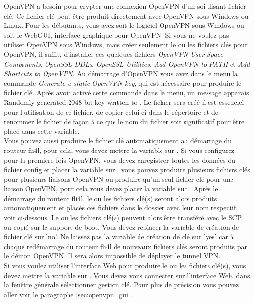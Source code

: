 \begin{description}
  OpenVPN a besoin pour crypter une connexion OpenVPN d'un soi-disant fichier clé.
  Ce fichier clé peut être produit directement avec OpenVPN sous Windows ou Linux.
  Pour les débutants, vous avez soit le logiciel OpenVPN sous Windows ou soit le
  WebGUI, interface graphique pour OpenVPN. Si vous ne voulez pas utiliser OpenVPN
  sous Windows, mais créer seulement le ou les fichiers clés pour OpenVPN, il suffit,
  d'installer ces quelques fichiers \emph{OpenVPN User-Space Components}, \emph{OpenSSL DDLs},
  \emph{OpenSSL Utilities}, \emph{Add OpenVPN to PATH} et \emph{Add Shortcuts to OpenVPN}.
  Au démarrage d'OpenVPN vous avez dans le menu la commande \emph{Generate a static OpenVPN key},
  qui est nécessaire pour produire le fichier clé. Après avoir activé cette commande
  dans le menu, un message apparais \flqq{}Randomly generated 2048 bit key written to
  \frqq{}. Le fichier  sera
  créé il est essenciel pour l'utilisation de ce fichier, de copier celui-ci dans
  le répertoire  et de renommer le fichier 
  de façon à ce que le nom du fichier soit significatif pour être placé dans cette variable.\\
  Vous pouvez aussi produire le fichier clé automatiquement au démarrage du routeur fli4l,
  pour cela, vous devez mettre la variable  sur
  . Si vous configurez pour la première fois OpenVPN, vous devez
  enregistrer toutes les données du fichier config et placer la variable
   sur ,
  vous pouvez produire plusieurs fichiers clés pour plusieurs liaisons OpenVPN ou
  produire qu'un seul fichier clé pour une liaison OpenVPN, pour cela vous devez
  placer la variable  sur . Après le
  démarrage du routeur fli4l, le ou les fichiers clé(s) seront alors produits
  automatiquement et placés ces fichiers dans le dossier  avec
  leur nom respectif, voir ci-dessous. Le ou les fichiers clé(s) peuvent alors
  être transféré avec le SCP ou copié sur le support de boot. Vous devez replacer
  la variable de création de fichier clé sur 'no'. Ne laissez pas la variable de
  création de clé sur 'yes' car à chaque redémarrage du routeur fli4l de nouveaux
  fichiers clés seront produits par le démon OpenVPN. Il sera alors impossible de
  déployer le tunnel VPN.\\
  Si vous voulez utiliser l'interface Web pour produire le ou les fichiers clé(s),
  vous devez mettre la variable  sur .
  Vous devez vous connecter sur l'interface Web, dans la fenêtre générale
  sélectionner gestion clé. Pour plus de précision vous pouvez aller voir
  le paragraphe \ref{sec:openvpn_gui}.


\end{description}
